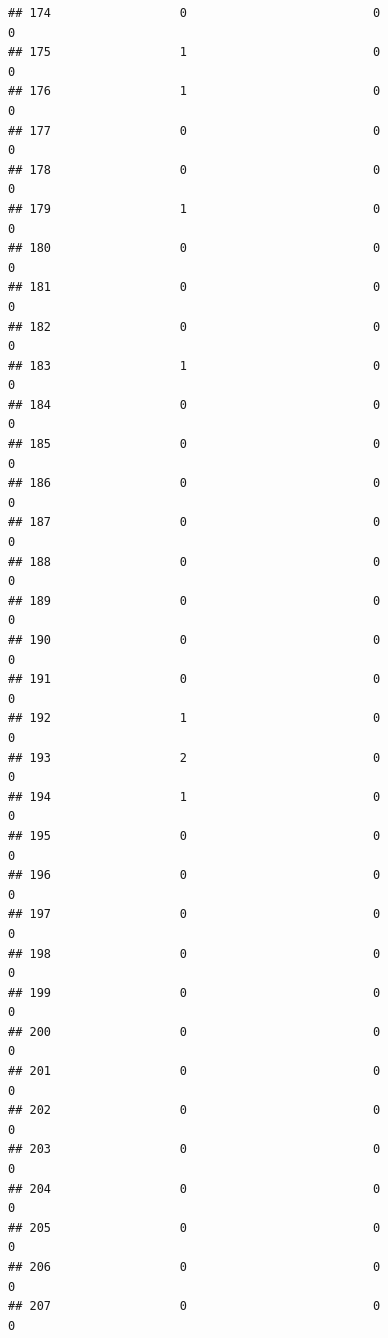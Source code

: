 \documentclass[
]{article}
\begin{document}
\begin{verbatim}
## 174                  0                          0                       0
## 175                  1                          0                       0
## 176                  1                          0                       0
## 177                  0                          0                       0
## 178                  0                          0                       0
## 179                  1                          0                       0
## 180                  0                          0                       0
## 181                  0                          0                       0
## 182                  0                          0                       0
## 183                  1                          0                       0
## 184                  0                          0                       0
## 185                  0                          0                       0
## 186                  0                          0                       0
## 187                  0                          0                       0
## 188                  0                          0                       0
## 189                  0                          0                       0
## 190                  0                          0                       0
## 191                  0                          0                       0
## 192                  1                          0                       0
## 193                  2                          0                       0
## 194                  1                          0                       0
## 195                  0                          0                       0
## 196                  0                          0                       0
## 197                  0                          0                       0
## 198                  0                          0                       0
## 199                  0                          0                       0
## 200                  0                          0                       0
## 201                  0                          0                       0
## 202                  0                          0                       0
## 203                  0                          0                       0
## 204                  0                          0                       0
## 205                  0                          0                       0
## 206                  0                          0                       0
## 207                  0                          0                       0

\end{verbatim}
\end{document}
